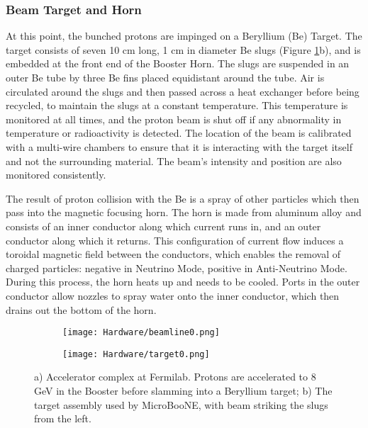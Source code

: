 \subsubsection{Beam Target and Horn}
\par At this point, the bunched protons are impinged on a Beryllium (Be) Target. The target consists of seven 10 cm long, 1 cm in diameter Be slugs (Figure \ref{fig:beamline0}b), and is embedded at the front end of the Booster Horn. The slugs are suspended in an outer Be tube by three Be fins placed equidistant around the tube.  Air is circulated around the slugs and then passed across a heat exchanger before being recycled, to maintain the slugs at a constant temperature. This temperature is monitored at all times, and the proton beam is shut off if any abnormality in temperature or radioactivity is detected. The location of the beam is calibrated with a multi-wire chambers to ensure that it is interacting with the target itself and not the surrounding material. The beam's intensity and position are also monitored consistently.
\par The result of proton collision with the Be is a spray of other particles which then pass into the magnetic focusing horn. The horn is made from aluminum alloy and consists of an inner conductor along which current runs in, and an outer conductor along which it returns. This configuration of current flow induces a toroidal magnetic field between the conductors, which enables the removal of charged particles: negative in Neutrino Mode, positive in Anti-Neutrino Mode. During this process, the horn heats up and needs to be cooled.  Ports in the outer conductor allow nozzles to spray water onto the inner conductor, which then drains out the bottom of the horn.

\begin{figure}[H]
  \begin{subfigure}[t]{0.3\textwidth}
    \centering
\texttt{[image: Hardware/beamline0.png]}
  \caption{ }
  \end{subfigure} 
  \hspace{3mm}
  \begin{subfigure}[t]{0.6\textwidth}
    \centering
\texttt{[image: Hardware/target0.png]}
  \caption{ }
  \end{subfigure} 
\caption{ a) Accelerator complex at Fermilab. Protons are accelerated to 8 GeV in the Booster before slamming into a Beryllium target; b) The target assembly used by MicroBooNE, with beam striking the slugs from the left. } 
\label{fig:beamline0}
\end{figure}



